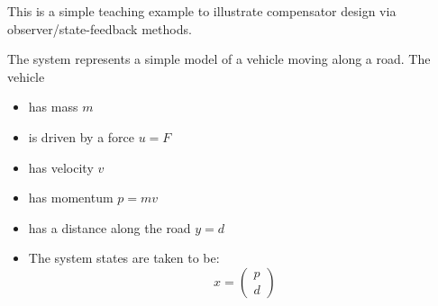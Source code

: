 

This is a simple teaching example to illustrate compensator design via
observer/state-feedback methods.

The system represents a simple model of a vehicle moving along a road.
The vehicle
\begin{itemize}
\item has mass $m$
\item is driven by a force $u=F$
\item has velocity $v$ 
\item has momentum $p=mv$ 
\item has a distance along the road $y=d$
\item The system states are taken to be:
  \begin{equation}
    x = 
    \begin{pmatrix}
      p \\ d
    \end{pmatrix}
  \end{equation}\end{itemize}

